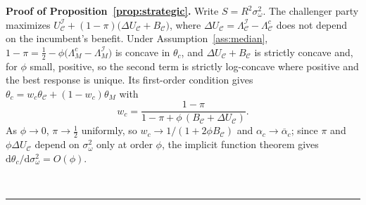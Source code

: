 \documentclass[12pt,letterpaper]{article}
\newenvironment{proof}[1][Proof]{\noindent\textbf{#1.} }{\ \rule{0.5em}{0.5em}}
\begin{document}
\begin{proof}[Proof of Proposition~\ref{prop:strategic}]
Write $S=R^2 \sigma_\omega^2$. The challenger party maximizes $U_{\mathcal C}^{\mathcal I}+(1-\pi)\big(\Delta U_{\mathcal C}+B_{\mathcal C}\big)$, where $\Delta U_{\mathcal C}=\Lambda_{\mathcal C}^{\mathcal I}-\Lambda_{\mathcal C}^c$ does not depend on the incumbent's benefit. Under Assumption~\ref{ass:median}, $1-\pi=\tfrac12-\phi\big(\Lambda_M^c-\Lambda_M^{\mathcal I}\big)$ is concave in $\theta_c$, and $\Delta U_{\mathcal C}+B_{\mathcal C}$ is strictly concave and, for $\phi$ small, positive, so the second term is strictly log-concave where positive and the best response is unique. Its first-order condition gives $\theta_c=w_c\theta_{\mathcal C}+(1-w_c)\theta_M$ with
\[
w_c=\frac{1-\pi}{1-\pi+\phi\,(B_{\mathcal C}+\Delta U_{\mathcal C})}.
\]
As $\phi\to0$, $\pi\to\tfrac12$ uniformly, so $w_c\to1/(1+2\phi B_{\mathcal C})$ and $\alpha_c\to\overline{\alpha}_c$; since $\pi$ and $\phi\Delta U_{\mathcal C}$ depend on $\sigma_\omega^2$ only at order $\phi$, the implicit function theorem gives $\mathrm{d}\theta_c/\mathrm{d}\sigma_\omega^2=O(\phi)$.


\end{proof}
\end{document}
